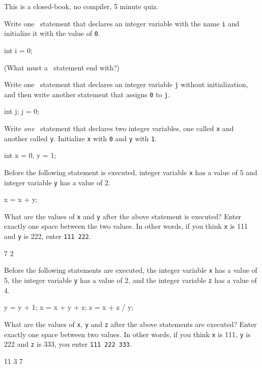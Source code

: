 

This is a closed-book, no compiler, 5 minute quiz.

\nextq
Write one \cpp\ statement that
declares an integer variable with the name
\verb!i! and initialize it with the value of \verb!0!.
\\
\ANSWER
\begin{answercode}
int i = 0;
\end{answercode}
(What must a \cpp\ statement end with?)

\nextq
Write one \cpp\ statement that declares an integer variable \verb!j!
without initialization, and then write another statement that
assigns \verb!0! to \verb!j!.
\\
\ANSWER
\begin{answercode}
int j;
j = 0;
\end{answercode}

\nextq
Write \textit{one} \cpp\ statement that declares two integer variables,
one called \texttt{x} and another called \texttt{y}.
Initialize \texttt{x} with \texttt{0} and \texttt{y} with \texttt{1}.
\\
\ANSWER
\begin{answercode}
int x = 0, y = 1;
\end{answercode}

\nextq
Before the following statement is executed,
integer variable \verb!x! has a value of 5
and integer variable \verb!y! has a value of 2.
\begin{console}[fontsize=\footnotesize]
x = x + y;
\end{console}
What are the values of \verb!x! and \verb!y! after the above statement is
executed?
Enter exactly one space between the two values.
In other words, if you think \verb!x! is 111 and \verb!y! is 222,
enter \verb!111 222!.
\\
\ANSWER
\begin{answercode}
7 2
\end{answercode}

\nextq
Before the following statements are executed,
the integer variable \verb!x! has a value of 5,
the integer variable \verb!y! has a value of 2, and
the integer variable \verb|z| has a value of 4.
\begin{console}[fontsize=\footnotesize]
y = y + 1;
x = x + y + z;
z = x + z / y;
\end{console}
What are the values of \verb!x!, \verb!y! and \verb!z!
after the above statements are executed?
Enter exactly one space between two values.
In other words, if you think \verb!x! is 111, \verb!y! is 222 and \verb!z! is 333,
you enter \verb!111 222 333!.
\\
\ANSWER
\begin{answercode}
11 3 7
\end{answercode}

